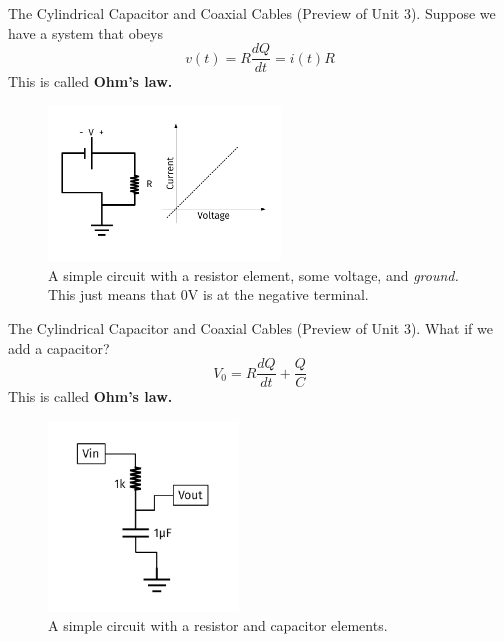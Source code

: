 \documentclass{beamer}
\begin{document}
\begin{frame}{The Cylindrical Capacitor and Coaxial Cables}
(Preview of Unit 3).  Suppose we have a system that obeys
\begin{equation}
v(t) = R \frac{dQ}{dt} = i(t) R
\end{equation}
This is called \textbf{Ohm's law.}
\begin{figure}
\centering
\includegraphics[width=0.55\textwidth]{figures/iVCurve.pdf}
\caption{\label{fig:iv} A simple circuit with a resistor element, some voltage, and \textit{ground.} This just means that 0V is at the negative terminal.}
\end{figure}
\end{frame}

\begin{frame}{The Cylindrical Capacitor and Coaxial Cables}
(Preview of Unit 3).  What if we add a capacitor?
\begin{equation}
V_0 = R \frac{dQ}{dt} +\frac{Q}{C}
\end{equation}
This is called \textbf{Ohm's law.}
\begin{figure}
\centering
\includegraphics[width=0.45\textwidth]{figures/iVCurve8.pdf}
\caption{\label{fig:iv2} A simple circuit with a resistor and capacitor elements.}
\end{figure}
\end{frame}
\end{document}
